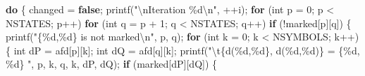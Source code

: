 \documentclass[
  brazilian,
  letterpaper,
]{book}
\newenvironment{Shaded}{\begin{snugshade}}{\end{snugshade}}
\newcommand{\ControlFlowTok}[1]{\textcolor[rgb]{0.00,0.23,0.31}{\textbf{#1}}}
\newcommand{\DataTypeTok}[1]{\textcolor[rgb]{0.68,0.00,0.00}{#1}}
\newcommand{\DecValTok}[1]{\textcolor[rgb]{0.68,0.00,0.00}{#1}}
\newcommand{\KeywordTok}[1]{\textcolor[rgb]{0.00,0.23,0.31}{\textbf{#1}}}
\newcommand{\NormalTok}[1]{\textcolor[rgb]{0.00,0.23,0.31}{#1}}
\newcommand{\OperatorTok}[1]{\textcolor[rgb]{0.37,0.37,0.37}{#1}}
\newcommand{\SpecialCharTok}[1]{\textcolor[rgb]{0.37,0.37,0.37}{#1}}
\newcommand{\StringTok}[1]{\textcolor[rgb]{0.13,0.47,0.30}{#1}}
\theoremstyle{plain}
\theoremstyle{definition}
\theoremstyle{remark}
\begin{document}
\begin{Shaded}
\begin{Highlighting}[]
    \ControlFlowTok{do}
    \OperatorTok{\{}
\NormalTok{        changed }\OperatorTok{=} \KeywordTok{false}\OperatorTok{;}
\NormalTok{        printf}\OperatorTok{(}\StringTok{"}\SpecialCharTok{\textbackslash{}n}\StringTok{Iteration }\SpecialCharTok{\%d\textbackslash{}n}\StringTok{"}\OperatorTok{,} \OperatorTok{++}\NormalTok{i}\OperatorTok{);}
        \ControlFlowTok{for} \OperatorTok{(}\DataTypeTok{int}\NormalTok{ p }\OperatorTok{=} \DecValTok{0}\OperatorTok{;}\NormalTok{ p }\OperatorTok{\textless{}}\NormalTok{ NSTATES}\OperatorTok{;}\NormalTok{ p}\OperatorTok{++)}
            \ControlFlowTok{for} \OperatorTok{(}\DataTypeTok{int}\NormalTok{ q }\OperatorTok{=}\NormalTok{ p }\OperatorTok{+} \DecValTok{1}\OperatorTok{;}\NormalTok{ q }\OperatorTok{\textless{}}\NormalTok{ NSTATES}\OperatorTok{;}\NormalTok{ q}\OperatorTok{++)}
                \ControlFlowTok{if} \OperatorTok{(!}\NormalTok{marked}\OperatorTok{[}\NormalTok{p}\OperatorTok{][}\NormalTok{q}\OperatorTok{])}
                \OperatorTok{\{}
\NormalTok{                    printf}\OperatorTok{(}\StringTok{"\{}\SpecialCharTok{\%d}\StringTok{,}\SpecialCharTok{\%d}\StringTok{\} is not marked}\SpecialCharTok{\textbackslash{}n}\StringTok{"}\OperatorTok{,}\NormalTok{ p}\OperatorTok{,}\NormalTok{ q}\OperatorTok{);}
                    \ControlFlowTok{for} \OperatorTok{(}\DataTypeTok{int}\NormalTok{ k }\OperatorTok{=} \DecValTok{0}\OperatorTok{;}\NormalTok{ k }\OperatorTok{\textless{}}\NormalTok{ NSYMBOLS}\OperatorTok{;}\NormalTok{ k}\OperatorTok{++)}
                    \OperatorTok{\{}
                        \DataTypeTok{int}\NormalTok{ dP }\OperatorTok{=}\NormalTok{ afd}\OperatorTok{[}\NormalTok{p}\OperatorTok{][}\NormalTok{k}\OperatorTok{];}
                        \DataTypeTok{int}\NormalTok{ dQ }\OperatorTok{=}\NormalTok{ afd}\OperatorTok{[}\NormalTok{q}\OperatorTok{][}\NormalTok{k}\OperatorTok{];}
\NormalTok{                        printf}\OperatorTok{(}\StringTok{"}\SpecialCharTok{\textbackslash{}t}\StringTok{\{d(}\SpecialCharTok{\%d}\StringTok{,}\SpecialCharTok{\%d}\StringTok{\}, d(}\SpecialCharTok{\%d}\StringTok{,}\SpecialCharTok{\%d}\StringTok{)\} = \{}\SpecialCharTok{\%d}\StringTok{, }\SpecialCharTok{\%d}\StringTok{\} "}\OperatorTok{,} 
\NormalTok{                                p}\OperatorTok{,}\NormalTok{ k}\OperatorTok{,}\NormalTok{ q}\OperatorTok{,}\NormalTok{ k}\OperatorTok{,}\NormalTok{ dP}\OperatorTok{,}\NormalTok{ dQ}\OperatorTok{);}
                        \ControlFlowTok{if} \OperatorTok{(}\NormalTok{marked}\OperatorTok{[}\NormalTok{dP}\OperatorTok{][}\NormalTok{dQ}\OperatorTok{])}
                        \OperatorTok{\{}

\end{Highlighting}
\end{Shaded}
\end{document}
